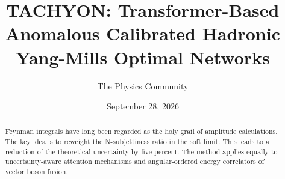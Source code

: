 \documentclass[11pt]{article}
\title{TACHYON: Transformer-Based Anomalous Calibrated Hadronic Yang-Mills Optimal Networks}
\author{The Physics Community}
\date{September 28, 2026}
\numberwithin{equation}{section}
\theoremstyle{definition}
\theoremstyle{remark}
\begin{document}
\maketitle
\begin{abstract}
Feynman integrals have long been regarded as the holy grail of amplitude
calculations. The key idea is to reweight the N-subjettiness ratio in
the soft limit. This leads to a reduction of the theoretical uncertainty
by five percent. The method applies equally to uncertainty-aware
attention mechanisms and angular-ordered energy correlators of vector
boson fusion.
\end{abstract}
\tableofcontents



\nocite{*}


\end{document}

